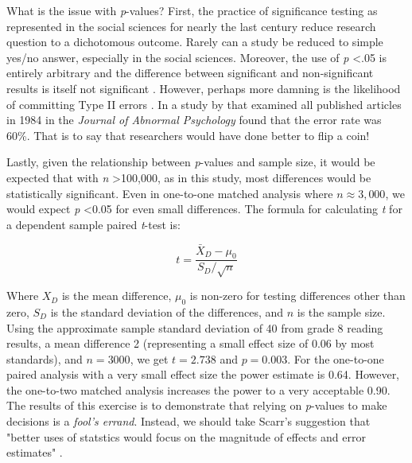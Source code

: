 \documentclass[letterpaper,12p,twoside]{article} %
\begin{document}
What is the issue with \textit{p}-values? First, the practice of significance testing as represented in the social sciences for nearly the last century reduce research question to a dichotomous outcome. Rarely can a study be reduced to simple yes/no answer, especially in the social sciences. Moreover, the use of \textit{p} \textless .05 is entirely arbitrary and the difference between significant and non-significant results is itself not significant \cite{GelmanStern2006}. However, perhaps more damning is the likelihood of committing Type II errors \cite{Bakan1966,Carver1978,Cohen1994,HenkelMorrison1970,Rozeboom1960,Schmidt1996}. In a study by  that examined all published articles in 1984 in the \textit{Journal of Abnormal Psychology} found that the error rate was 60\%. That is to say that researchers would have done better to flip a coin!

Lastly, given the relationship between \textit{p}-values and sample size, it would be expected that with \textit{n} \textgreater 100,000, as in this study, most differences would be statistically significant. Even in one-to-one matched analysis where $n \approx 3,000$, we would expect \textit{p} \textless 0.05 for even small differences. The formula for calculating \textit{t} for a dependent sample paired \textit{t}-test is:

$$ t = \frac{{\bar{X}_D} - \mu_0}{S_D / \sqrt{n}} $$

\noindent Where $X_D$ is the mean difference, $\mu_0$ is non-zero for testing differences other than zero, $S_D$ is the standard deviation of the differences, and $n$ is the sample size. Using the approximate sample standard deviation of 40 from grade 8 reading results, a mean difference 2 (representing a small effect size of 0.06 by most standards), and $n = 3000$, we get $t = 2.738$ and $p = 0.003$. For the one-to-one paired analysis with a very small effect size the power estimate  is 0.64. However, the one-to-two matched analysis increases the power to a very acceptable 0.90. The results of this exercise is to demonstrate that relying on \textit{p}-values to make decisions is a \textit{fool's errand}. Instead, we should take Scarr's suggestion that "better uses of statstics would focus on the magnitude of effects and error estimates" \cite{Scarr1997}.
\end{document}

